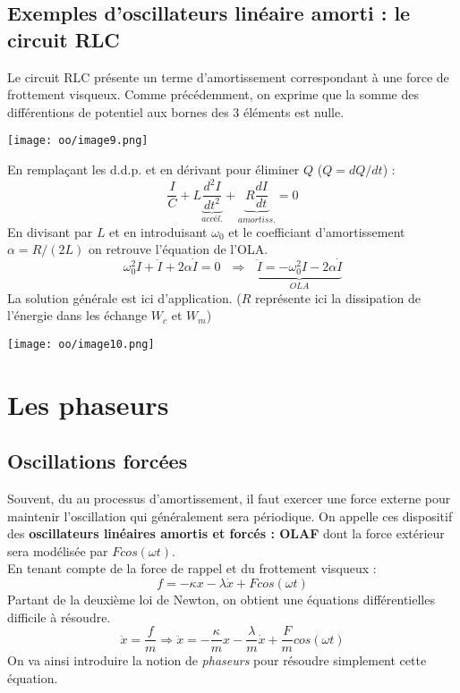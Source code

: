 \documentclass[british,french,11pt, a4paper, openany]{book}
\begin{document}
	\subsection{Exemples d'oscillateurs linéaire amorti : le circuit RLC}
	Le circuit RLC présente un terme d'amortissement correspondant à une force de frottement visqueux. Comme précédemment, on exprime que la somme des différentions de potentiel aux bornes des 3 éléments est nulle.
	
	\begin{center}
		\texttt{[image: oo/image9.png]}
	\end{center}
	En remplaçant les d.d.p. et en dérivant pour éliminer $Q$ ($Q = dQ/dt$) :
	\begin{equation}
		\frac{I}{C} + L \underbrace{\frac{d^2I}{dt^2}}_{accél.} + \underbrace{R\frac{dI}{dt}}_{amortiss.} = 0
	\end{equation}
	En divisant par $L$ et en introduisant $\omega_0$ et le coefficiant d'amortissement $\alpha = R/(2L)$ on retrouve l'équation de l'OLA.
	\begin{equation}
		\omega_0^2I + \ddot{I} + 2\alpha \dot{I} = 0\ \ \ \Rightarrow\ \ \ \underbrace{\ddot{I} = -\omega_0^2I - 2\alpha\dot{I}}_{OLA}
	\end{equation}
	La solution générale est ici d'application. ($R$ représente ici la dissipation de l'énergie dans les échange $W_c$ et $W_m$)
	\begin{center}
		\texttt{[image: oo/image10.png]}
	\end{center}
	
	\section{Les phaseurs}
	\subsection{Oscillations forcées}
	Souvent, du au processus d'amortissement, il faut exercer une force externe pour maintenir l'oscillation qui généralement sera périodique. On appelle ces dispositif des \textbf{oscillateurs linéaires amortis et forcés : OLAF} dont la force extérieur sera modélisée par $Fcos(\omega t)$.\\
	En tenant compte de la force de rappel et du frottement visqueux :
	\begin{equation}
		f = -\kappa x - \lambda \dot{x} + Fcos(\omega t)
	\end{equation}
	Partant de la deuxième loi de Newton, on obtient une équations différentielles difficile à résoudre.
	\begin{equation}
		\ddot{x} = \frac{f}{m} \Rightarrow \ddot{x} = -\frac{\kappa}{m}x - \frac{\lambda}{m}\dot{x} + \frac{F}{m}cos(\omega t)
	\end{equation}
	On va ainsi introduire la notion de \textit{phaseurs} pour résoudre simplement cette équation.
	
\end{document}
